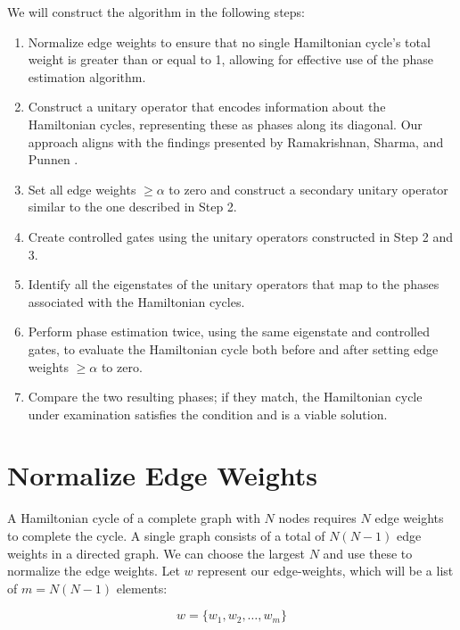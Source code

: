 \documentclass[msc,oneside]{ubcthesis}
\begin{document}
	We will construct the algorithm in the following steps:
	\begin{enumerate}
		\item Normalize edge weights to ensure that no single Hamiltonian cycle's total weight is greater than or equal to 1, allowing for effective use of the phase estimation algorithm.\\
		\item Construct a unitary operator that encodes information about the Hamiltonian cycles, representing these as phases along its diagonal. Our approach aligns with the findings presented by Ramakrishnan, Sharma, and Punnen \cite{srinivasan2018efficient}.\\
		\item Set all edge weights $\geq \alpha$ to zero and construct a secondary unitary operator similar to the one described in Step 2.\\
		\item Create controlled gates using the unitary operators constructed in Step 2 and 3.\\
		\item Identify all the eigenstates of the unitary operators that map to the phases associated with the Hamiltonian cycles.\\
		\item Perform phase estimation twice, using the same eigenstate and controlled gates, to evaluate the Hamiltonian cycle both before and after setting edge weights $\geq \alpha$ to zero.\\
		\item Compare the two resulting phases; if they match, the Hamiltonian cycle under examination satisfies the condition and is a viable solution.\\
		
	\end{enumerate}
		
	\section{Normalize Edge Weights}
	
		A Hamiltonian cycle of a complete graph with $N$ nodes requires $N$ edge weights to complete the cycle. A single graph consists of a total of $N(N-1)$ edge weights in a directed graph. We can choose the largest $N$ and use these to normalize the edge weights. Let $w$ represent our edge-weights, which will be a list of $m = N(N-1)$ elements:
	
	$$w = \{w_1, w_2, \ldots, w_m\}$$ 
	
\end{document}
